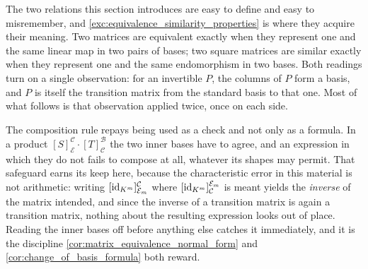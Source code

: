\begin{ainote}
The two relations this section introduces are easy to define and easy to
misremember, and \cref{exc:equivalence_similarity_properties} is where they
acquire their meaning. Two matrices are equivalent exactly when they represent
one and the same linear map in two pairs of bases; two square matrices are
similar exactly when they represent one and the same endomorphism in two bases.
Both readings turn on a single observation: for an invertible $P$, the columns
of $P$ form a basis, and $P$ is itself the transition matrix from the standard
basis to that one. Most of what follows is that observation applied twice, once
on each side.

The composition rule repays being used as a check and not only as a formula. In
a product $[S]_{\mathcal{E}}^{\mathcal{C}} \cdot [T]_{\mathcal{C}}^{\mathcal{B}}$
the two inner bases have to agree, and an expression in which they do not fails
to compose at all, whatever its shapes may permit. That safeguard earns its keep
here, because the characteristic error in this material is not arithmetic:
writing $[\operatorname{id}_{K^m}]_{\mathcal{E}_m}^{\mathcal{C}}$ where
$[\operatorname{id}_{K^m}]_{\mathcal{C}}^{\mathcal{E}_m}$ is meant yields the \emph{inverse}
of the matrix intended, and since the inverse of a transition matrix is again a
transition matrix, nothing about the resulting expression looks out of place.
Reading the inner bases off before anything else catches it immediately, and it
is the discipline \cref{cor:matrix_equivalence_normal_form} and
\cref{cor:change_of_basis_formula} both reward.
\end{ainote}
